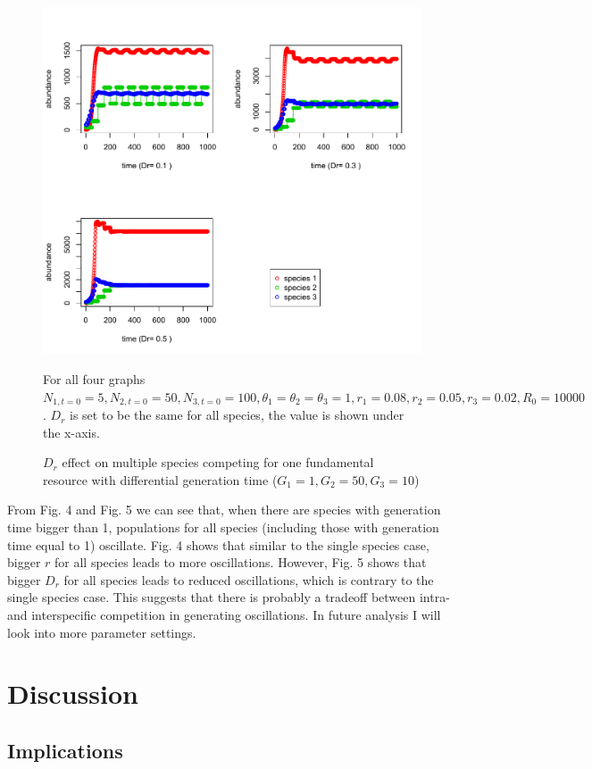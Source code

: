 \documentclass[12pt]{article}
\begin{document}
\begin{figure}
 \includegraphics[width=\textwidth]{oscillation_Dreffect.pdf}
 \caption{$D_r$ effect on multiple species competing for one fundamental resource with differential generation time ($G_1=1, G_2=50, G_3=10$)}
For all four graphs $ N_{1,t=0}=5, N_{2,t=0}=50,N_{3,t=0}=100, \theta_1=\theta_2=\theta_3=1, r_1=0.08, r_2 =0.05, r_3= 0.02, R_0=10000$. $D_r$ is set to be the same for all species, the value is shown under the x-axis.
\end{figure}

From Fig. 4 and Fig. 5 we can see that, when there are species with generation time bigger than 1, populations for all species (including those with generation time equal to 1) oscillate. Fig. 4 shows that similar to the single species case, bigger $r$ for all species leads to more oscillations. However, Fig. 5 shows that bigger $D_r$ for all species leads to reduced oscillations, which is contrary to the single species case. This suggests that there is probably a tradeoff between intra- and interspecific competition in generating oscillations. In future analysis I will look into more parameter settings.

\section{Discussion}

\subsection{Implications}
\end{document}
